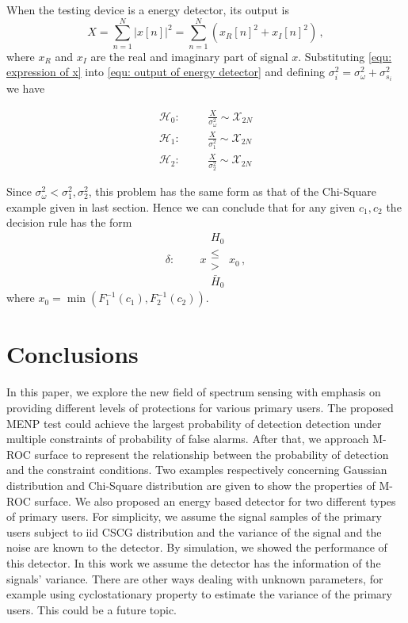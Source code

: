 \documentclass[12pt,journal,a4paper,twoside,onecolumn]{IEEEtran}
\begin{document}
\begin{spacing}{2.5}
When the testing device is a energy detector, its output is
\begin{equation}
  \label{equ: output of energy detector}
  X = \sum_{n=1}^{N}|x[n]|^2 = \sum_{n=1}^{N}(x_R[n]^2+x_I[n]^2)\,,
\end{equation}
where $x_R$ and $x_I$ are the real and imaginary part of signal $x$. Substituting \eqref{equ: expression of x} into \eqref{equ: output of energy detector} and defining $\sigma_{i}^2 = \sigma_\omega^2 + \sigma_{s_i}^2$ we have

  \begin{equation}
   \label{v3eq7}
   \begin{split}
     \mathcal{H}_0:\;\;\;\;\;\;&\frac{X}{\sigma_\omega^2} \sim \mathcal{X}_{2N}\\
     \mathcal{H}_1:\;\;\;\;\;\;&\frac{X}{\sigma_1^2} \sim \mathcal{X}_{2N}\\
     \mathcal{H}_2:\;\;\;\;\;\;&\frac{X}{\sigma_{2}^2} \sim \mathcal{X}_{2N}
     \end{split}
 \end{equation}

Since $\sigma_\omega^2 < \sigma_1^2, \sigma_2^2$, this problem has the same form as that of the Chi-Square example given in last section.
Hence we can conclude that for any given $c_1, c_2$ the decision rule has the form
\begin{equation}
\label{equ: decision rule for spectrum sensing}
\delta:\;\;\;\;\;\;\;\; x \substack{H_0 \\ \leq \\ > \\\bar{H}_0} x_0\,,
 \end{equation}
where $x_0 = \min(F_1^{-1}(c_1), F_2^{-1}(c_2))$.

\section{Conclusions}
In this paper, we explore the new field of spectrum sensing with emphasis on providing different levels of protections for various primary users. 
The proposed MENP test could achieve the largest probability of detection detection under multiple constraints of probability of false alarms. 
After that, we approach M-ROC surface to represent the relationship between the probability of detection and the constraint conditions. Two examples respectively concerning Gaussian distribution and Chi-Square distribution are given to show the properties of M-ROC surface. 
We also proposed an energy based detector for two different types of primary users.
For simplicity, we assume the signal samples of the primary users subject to iid CSCG distribution and the variance of the signal and the noise are known to the detector.
By simulation, we showed the performance of this detector. 
In this work we assume the detector has the information of the signals' variance. There are other ways dealing with unknown parameters, for example using cyclostationary property to estimate the variance of the primary users. This could be a future topic.  


\end{spacing}
\end{document}
